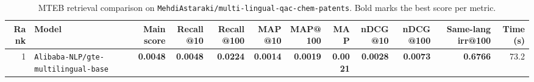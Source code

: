 \begin{table}[t]
\centering
\small
\begin{tabular}{r l r r r r r r r r r r}
\hline
Rank & Model & Main score & Recall@10 & Recall@100 & MAP@10 & MAP@100 & MAP & nDCG@10 & nDCG@100 & Same-lang irr@100 & Time (s) \\
\hline
1 & \texttt{Alibaba-NLP/gte-multilingual-base} & \textbf{0.0048} & \textbf{0.0048} & \textbf{0.0224} & \textbf{0.0014} & \textbf{0.0019} & \textbf{0.0021} & \textbf{0.0028} & \textbf{0.0073} & \textbf{0.6766} & 73.2 \\
\hline
\end{tabular}
\caption{MTEB retrieval comparison on \texttt{MehdiAstaraki/multi-lingual-qac-chem-patents}. Bold marks the best score per metric.}
\label{tab:mteb-model-comparison}
\end{table}
